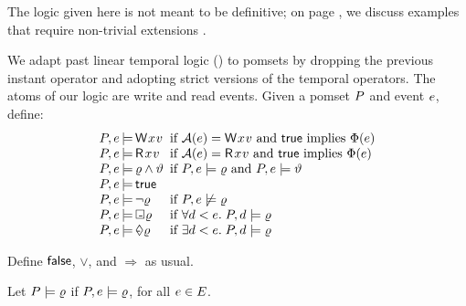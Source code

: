 The logic given here is not meant to be definitive; on page
\pageref{page:logic:limits}, we discuss \oota{} examples that require
non-trivial extensions
\cite{DBLP:conf/esop/SvendsenPDLV18,DBLP:journals/pacmpl/ChakrabortyV19}.

We adapt past linear temporal logic (\pLTL)
\cite{Lichtenstein:1985:GP:648065.747612} to pomsets by dropping the previous
instant operator and adopting strict versions of the temporal operators.
The atoms of our logic are write and read events.
Given a pomset $P$ and event $e$, define:
\begin{displaymath}
  \renewcommand{\arraycolsep}{.2ex}
    \begin{array}{lrll}
      \aPS,\aEv &\models& \DW{\aLoc}{\aVal} &\text{ if } \labelingAct(\aEv) = \DW{\aLoc}{\aVal} \text{ and } \TRUE \text{ implies } \labelingForm(\aEv) \\
      \aPS,\aEv &\models& \DR{\aLoc}{\aVal} &\text{ if } \labelingAct(\aEv) = \DR{\aLoc}{\aVal} \text{ and } \TRUE \text{ implies } \labelingForm(\aEv) \\
      \aPS,\aEv &\models& \afo\land\bfo &\text{ if } \aPS,\aEv \models  \afo \text{ and } \aPS,\aEv \models  \bfo \\
      \aPS,\aEv &\models& \TRUE\\
      \aPS,\aEv &\models& \lnot\afo &\text{ if } \aPS,\aEv \not\models \afo \\
      \aPS,\aEv &\models& \always\afo &\text{ if } \forall \bEv \lt \aEv.\; \aPS,\bEv \models \afo\\
      \aPS,\aEv &\models& \once\afo &\text{ if } \exists \bEv \lt \aEv.\;  \aPS,\bEv \models \afo 
    \end{array} 
  \end{displaymath}

  Define $\mathsf{false}$, $\lor$, and $\Rightarrow$ as usual.

  Let $P \models \varrho$ if
  $P,e \models\varrho$, for all $e \in E$.

